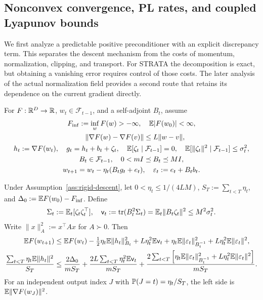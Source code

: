 \subsection{Nonconvex convergence, PL rates, and coupled Lyapunov bounds}
We first analyze a predictable positive preconditioner with an explicit
discrepancy term. This separates the descent mechanism from the costs of
momentum, normalization, clipping, and transport. For STRATA the decomposition
is exact, but obtaining a vanishing error requires control of those costs.
The later analysis of the actual normalization field provides a second route
that retains its dependence on the current gradient directly.

\begin{assumption}\label{ass:rigid-descent}
For $F:\mathbb R^D\to\mathbb R$, $w_t\in\mathcal F_{t-1}$, and a self-adjoint $B_t$, assume
\begin{gather}
 F_{\inf}:=\inf_wF(w)>-\infty,\quad\mathbb E|F(w_0)|<\infty,\\\quad
 \|\nabla F(w)-\nabla F(v)\|\le L\|w-v\|,\\
 h_t:=\nabla F(w_t),\quad g_t=h_t+b_t+\zeta_t,\quad
 \mathbb E[\zeta_t\mid\mathcal F_{t-1}]=0,\quad
 \mathbb E[\|\zeta_t\|^2\mid\mathcal F_{t-1}]\le\sigma_t^2,\\
 B_t\in\mathcal F_{t-1},\quad 0<mI\preceq B_t\preceq MI,\\
 w_{t+1}=w_t-\eta_t(B_tg_t+e_t),\quad
 \varepsilon_t:=e_t+B_tb_t.
\end{gather}
\end{assumption}
\begin{theorem}\label{thm:tf-convergence}
Under Assumption~\ref{ass:rigid-descent}, let
$0<\eta_t\le1/(4LM)$, $S_T:=\sum_{t<T}\eta_t$, and
$\Delta_0:=\mathbb E F(w_0)-F_{\inf}$. Define
\begin{equation}
 \Sigma_t:=\mathbb E_t[\zeta_t\zeta_t^\top],\quad
 \mathsf v_t:=\operatorname{tr}(B_t^2\Sigma_t)=\mathbb E_t\|B_t\zeta_t\|^2
                         \le M^2\sigma_t^2.
\end{equation}
Write $\|x\|_A^2:=x^\top Ax$ for $A\succ0$. Then
\begin{align}
 \mathbb E F(w_{t+1})
 &\le\mathbb E F(w_t)-\tfrac12\eta_t\mathbb E\|h_t\|_{B_t}^2
       +L\eta_t^2\mathbb E\mathsf v_t
       +\eta_t\mathbb E\|\varepsilon_t\|_{B_t^{-1}}^2
       +L\eta_t^2\mathbb E\|\varepsilon_t\|^2,\\
 \frac{\sum_{t<T}\eta_t\mathbb E\|h_t\|^2}{S_T}
 &\le\frac{2\Delta_0}{mS_T}
 +\frac{2L\sum_{t<T}\eta_t^2\mathbb E\mathsf v_t}{mS_T}
 +\frac{2\sum_{t<T}\left[\eta_t\mathbb E\|\varepsilon_t\|_{B_t^{-1}}^2
                         +L\eta_t^2\mathbb E\|\varepsilon_t\|^2\right]}{mS_T}.
 \label{eq:tf-stationarity}
\end{align}
For an independent output index $J$ with $\mathbb P(J=t)=\eta_t/S_T$, the left side is
$\mathbb E\|\nabla F(w_J)\|^2$.
\end{theorem}
